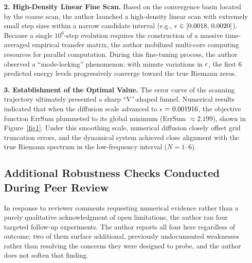 \documentclass[mca,article,submit,oneauthor,pdftex]{Definitions/mdpi}
\begin{document}
\textbf{2. High-Density Linear Fine Scan.} Based on the convergence basin
located by the coarse scan, the author launched a high-density linear scan
with extremely small step sizes within a narrow candidate interval (e.g.,
\(\text{\ensuremath{\epsilon}~\ensuremath{\in}~[0.0018, 0.0020]}\)). Because a single
\(\text{10}^{\text{6}}\)-step evolution requires the construction of a
massive time-averaged empirical transfer matrix, the author mobilized
multi-core computing resources for parallel computation. During this
fine-tuning process, the author observed a ``mode-locking'' phenomenon: with
minute variations in \(\text{\ensuremath{\epsilon}}\), the first 6 predicted energy
levels progressively converge toward the true Riemann zeros.

\textbf{3. Establishment of the Optimal Value.} The error curve of the
scanning trajectory ultimately presented a sharp ``V''-shaped funnel.
Numerical results indicated that when the diffusion scale advanced to
\(\text{\ensuremath{\epsilon} = 0.001916}\), the objective function ErrSum plummeted
to its global minimum (ErrSum $\approx2.199$), shown in Figure~\ref{fig1}.
Under this smoothing scale, numerical diffusion closely offset grid
truncation errors, and the dynamical system achieved close alignment with
the true Riemann spectrum in the low-frequency interval ($N=1$--$6$).

\subsection{Additional Robustness Checks Conducted During Peer Review}\label{sec:post-review-checks}

In response to reviewer comments requesting numerical evidence rather
than a purely qualitative acknowledgment of open limitations, the author ran
four targeted follow-up experiments. The author reports all four here regardless
of outcome; two of them surface additional, previously undocumented
weaknesses rather than resolving the concerns they were designed to
probe, and the author does not soften that finding.
\end{document}
